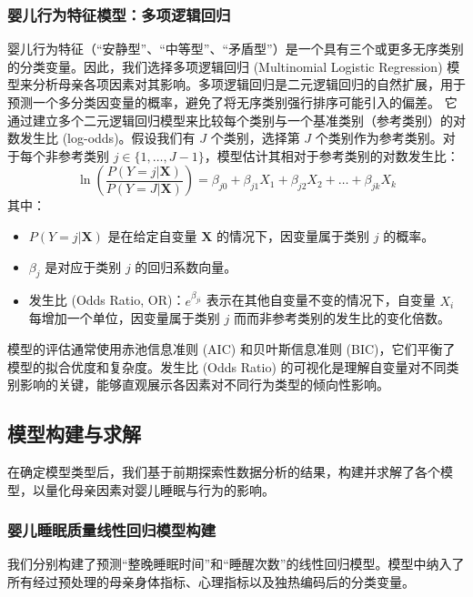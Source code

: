 \documentclass[withoutpreface,bwprint]{cumcmthesis}
\begin{document}
\subsubsection{婴儿行为特征模型：多项逻辑回归}
婴儿行为特征（“安静型”、“中等型”、“矛盾型”）是一个具有三个或更多无序类别的分类变量。因此，我们选择多项逻辑回归 (Multinomial Logistic Regression) 模型来分析母亲各项因素对其影响。多项逻辑回归是二元逻辑回归的自然扩展，用于预测一个多分类因变量的概率，避免了将无序类别强行排序可能引入的偏差。
它通过建立多个二元逻辑回归模型来比较每个类别与一个基准类别（参考类别）的对数发生比 (log-odds)。假设我们有 $J$ 个类别，选择第 $J$ 个类别作为参考类别。对于每个非参考类别 $j \in \{1, \dots, J-1\}$，模型估计其相对于参考类别的对数发生比：
$$ \ln\left(\frac{P(Y=j | \mathbf{X})}{P(Y=J | \mathbf{X})}\right) = \beta_{j0} + \beta_{j1} X_1 + \beta_{j2} X_2 + \dots + \beta_{jk} X_k $$
其中：
\begin{itemize}
    \item $P(Y=j | \mathbf{X})$ 是在给定自变量 $\mathbf{X}$ 的情况下，因变量属于类别 $j$ 的概率。
    \item $\beta_{j}$ 是对应于类别 $j$ 的回归系数向量。
\item 发生比 (Odds Ratio, OR)：$e^{\beta_{ji}}$ 表示在其他自变量不变的情况下，自变量 $X_i$ 每增加一个单位，因变量属于类别 $j$ 而而非参考类别的发生比的变化倍数。
\end{itemize}
模型的评估通常使用赤池信息准则 (AIC) 和贝叶斯信息准则 (BIC)，它们平衡了模型的拟合优度和复杂度。发生比 (Odds Ratio) 的可视化是理解自变量对不同类别影响的关键，能够直观展示各因素对不同行为类型的倾向性影响。

\subsection{模型构建与求解}
在确定模型类型后，我们基于前期探索性数据分析的结果，构建并求解了各个模型，以量化母亲因素对婴儿睡眠与行为的影响。

\subsubsection{婴儿睡眠质量线性回归模型构建}
我们分别构建了预测“整晚睡眠时间”和“睡醒次数”的线性回归模型。模型中纳入了所有经过预处理的母亲身体指标、心理指标以及独热编码后的分类变量。
\end{document}
